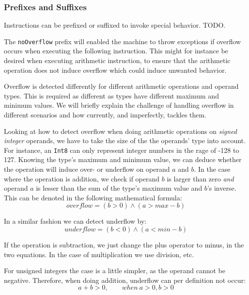 
\subsubsection{Prefixes and Suffixes}

Instructions can be prefixed or suffixed to invoke special behavior. TODO.

The {\tt noOverflow} prefix will enabled the machine to throw exceptions if
overflow occurs when executing the following instruction. This might for
instance be desired when executing arithmetic instruction, to ensure that the
arithmetic operation does not induce overflow which could induce unwanted
behavior.

Overflow is detected differently for different arithmetic operations and operand
types. This is required as different as types have different maximum and minimum
values. We will briefly explain the challenge of handling overflow in different
scenarios and how \thename{} currently, and imperfectly, tackles them.

Looking at how to detect overflow when doing arithmetic operations on {\em
  signed integer} operands, we have to take the size of the the operands' type
into account. For instance, an {\tt Int8} can only represent integer numbers in
the rage of -128 to 127. Knowing the type's maximum and minimum value, we can
deduce whether the operation will induce over- or underflow on operand $a$ and
$b$. In the case where the operation is addition, we check if operand $b$ is
larger than zero {\em and} operand $a$ is lesser than the sum of the type's
maximum value and $b$'s inverse. This can be denoted in the following
mathematical formula:
\label{eq:overflow}
\begin{equation}
  overflow = (b > 0) \wedge (a > max - b)
\end{equation}

In a similar fashion we can detect underflow by:
\begin{equation}
  underflow = (b < 0) \wedge (a < min - b)
\end{equation}

If the operation is subtraction, we just change the plus operator to minus, in
the two equations. In the case of multiplication we use division, etc.

For unsigned integers the case is a little simpler, as the operand cannot be
negative. Therefore, when doing addition, underflow can per definition not
occur:
\begin{equation}
  a + b > 0, \qquad when\ a > 0, b > 0
\end{equation}

